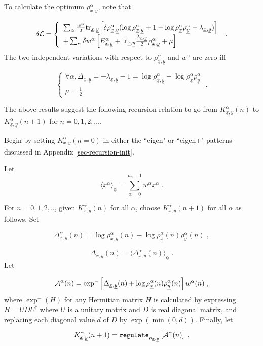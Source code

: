 \documentclass[12pt]{article}%
\newcommand{\av}[1]{\langle#1\rangle}
\newcommand{\tr}[0]{{\rm tr }}
\newcommand{\beq}{\begin{equation}}
\newcommand{\eeq}{\end{equation}}
\newcommand{\ul}[1]{\underline{#1}}
\newcommand{\rvx}[0]{{\ul{x}}}
\newcommand{\rvy}[0]{{\ul{y}}}
\newcommand{\cala}[0]{{\cal A}}
\newcommand{\lam}[0]{\lambda}
\newcommand{\rvalp}[0]{{\ul{\alpha}}}
\newcommand{\alp}[0]{{\alpha}}
\begin{document}
To calculate the optimum $\rho^\alp_{\rvx,\rvy}$, note that

\beq
\delta{\cal L}=\left\{
\begin{array}{l}
\sum_\alp \frac{w^\alp}{2}\tr_{\rvx, \rvy}\left[\delta\rho^\alp_{\rvx,\rvy}
(\log \rho^\alp_{\rvx,\rvy}+1
-\log \rho^{\alp}_{\rvx}
\rho^{\alp}_{\rvy}
+\lam_{\rvx,\rvy})\right]\\
+\sum_\alp\delta w^\alp\left[
E^\alp_{\rvx,\rvy}
+\tr_{\rvx, \rvy}
\frac{\lam_{\rvx,\rvy}}{2}
\rho^\alp_{\rvx,\rvy}
+\mu\right]
\end{array}
\right.
\;.
\eeq
The two independent variations with respect to $\rho^\alp_{\rvx,\rvy}$
and $w^\alp$ are zero iff

\beq
\left\{
\begin{array}{l}
\forall \alp,
\Delta_{\rvx, \rvy}=-\lam_{\rvx, \rvy}-1
=
\log \rho^{\alp}_{\rvx,\rvy}
-
\log \rho^{\alp}_{\rvx}
\rho^{\alp}_{\rvy}
\\
\mu=\frac{1}{2}
\end{array}
\right.
\;.
\eeq

The above results suggest
the following recursion relation to go from
$K^{\alp}_{\rvx,\rvy}(n)$
to $K^{\alp}_{\rvx,\rvy}(n+1)$ for $n=0,1,2,\ldots$.

Begin by setting $K^{\alp}_{\rvx,\rvy}(n=0)$
in either the ``eigen" or ``eigen+" patterns discussed in
Appendix \ref{sec-recursion-init}.



Let
\beq
\av{x^\alp}_\rvalp = \sum_{\alp=0}^{n_\rvalp-1}w^\alp x^\alp
\;.
\eeq



For $n=0,1,2, ..$, given $K^{\alp}_{\rvx,\rvy}(n)$ for all $\alp$,
choose $K^{\alp}_{\rvx,\rvy}(n+1)$ for all $\alp$ as follows.
Set

\beq
\Delta^\alp_{\rvx, \rvy}(n)=
\log \rho^{\alp}_{\rvx,\rvy}(n)
-
\log \rho^{\alp}_{\rvx}(n)
\rho^{\alp}_{\rvy}(n)
\;,
\eeq

\beq
\Delta_{\rvx, \rvy}(n)=
\av{\Delta^\alp_{\rvx, \rvy}(n)}_\rvalp
\;.
\eeq
Let

\beq
\cala^\alp(n)=
\exp^-\left[
\Delta_{\rvx, \rvy}(n)
+
\log \rho^{\alp}_{\rvx}(n)
\rho^{\alp}_{\rvy}(n)
\right]w^\alp(n)
\;,
\eeq
where $\exp^-(H)$ for any Hermitian matrix $H$ is calculated by expressing
$H=UDU^\dag$ where $U$ is a unitary matrix and $D$ is real diagonal matrix, and
replacing each diagonal value
$d$ of $D$ by $\exp(\min(0, d))$. Finally, let


\beq
K^{\alp}_{\rvx,\rvy}(n+1)
=
{\tt regulate}_{\rho_{\rvx, \rvy}}\left[
\cala^\alp(n)\right]
\;,\label{eq-squashed-only1}
\eeq
\end{document}
